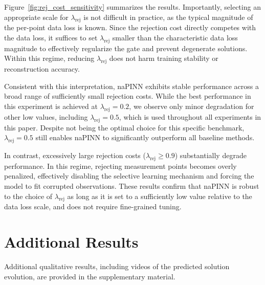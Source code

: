 \documentclass{article}
\theoremstyle{plain}
\theoremstyle{definition}
\theoremstyle{remark}
\begin{document}
Figure~\ref{fig:rej_cost_sensitivity} summarizes the results.
Importantly, selecting an appropriate scale for $\lambda_{\mathrm{rej}}$ is not difficult in practice, as the typical magnitude of the per-point data loss is known.
Since the rejection cost directly competes with the data loss, it suffices to set $\lambda_{\mathrm{rej}}$ smaller than the characteristic data loss magnitude to effectively regularize the gate and prevent degenerate solutions.
Within this regime, reducing $\lambda_{\mathrm{rej}}$ does not harm training stability or reconstruction accuracy.

Consistent with this interpretation, naPINN exhibits stable performance across a broad range of sufficiently small rejection costs.
While the best performance in this experiment is achieved at $\lambda_{\mathrm{rej}}=0.2$, we observe only minor degradation for other low values, including $\lambda_{\mathrm{rej}}=0.5$, which is used throughout all experiments in this paper.
Despite not being the optimal choice for this specific benchmark, $\lambda_{\mathrm{rej}}=0.5$ still enables naPINN to significantly outperform all baseline methods.

In contrast, excessively large rejection costs ($\lambda_{\mathrm{rej}} \ge 0.9$) substantially degrade performance.
In this regime, rejecting measurement points becomes overly penalized, effectively disabling the selective learning mechanism and forcing the model to fit corrupted observations.
These results confirm that naPINN is robust to the choice of $\lambda_{\mathrm{rej}}$ as long as it is set to a sufficiently low value relative to the data loss scale, and does not require fine-grained tuning.

\section{Additional Results}

Additional qualitative results, including videos of the predicted solution evolution, are provided in the supplementary material.


\end{document}
